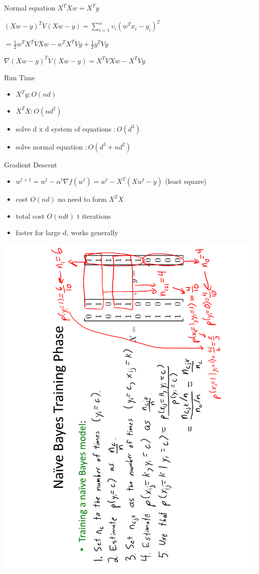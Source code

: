 \documentclass[1pt,letter]{article}
\def\half{\frac 1 2}
\def\items#1{\begin{itemize}[noitemsep,topsep=0pt,parsep=0pt,partopsep=0pt]#1\end{itemize}}
\begin{document}
\begin{minipage}{0.55\textwidth}
{{                \item Normal equation $X^T Xw =X^Ty$
                \item $(Xw-y)^T V (Xw-y) = \sum_{i=1}^n v_i (w^T x_i -y_i)^2$
                \item $= \half w^T X^TV X w -w^TX^TVy + \half y^TVy$
                \item $\nabla (Xw-y)^T V (Xw-y) = X^TVXw - X^TVy$
            }
            Run Time
            \items{
                \item $X^Ty: O(nd)$
                \item $X^TX: O(nd^2)$
                \item solve d x d system of equations $: O(d^3)$
                \item solve normal equation $: O(d^3 + nd^2)$
            }
            Gradient Descent
            \items{
                \item $w^{t+1} = w^t - \alpha^t \nabla f(w^t) = w^t -  X^T(Xw^t-y)$ (least square)
                \item cost $O(nd)$ no need to form $X^TX$
                \item total cost $O(ndt)$ t iterations 
                \item faster for large d, works generally
            }
    }
    
\end{minipage}

\newpage 
    \includegraphics[scale=0.4]{NaiveBayes.pdf}
\end{document}
